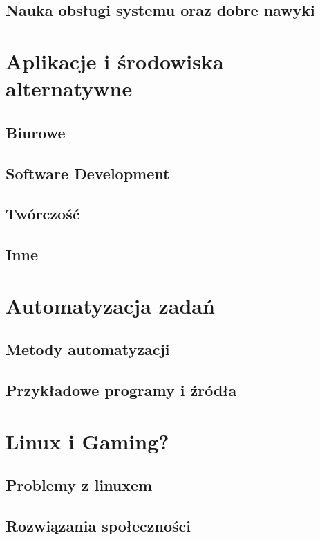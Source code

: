 \documentclass[10pt,a4paper]{report}
\begin{document}
	
	\section{Nauka obsługi systemu oraz dobre nawyki}
	
\chapter{Aplikacje i środowiska alternatywne}

	\section{Biurowe}
	
	\section{Software Development}
	
	\section{Twórczość}
	
	\section{Inne}
	
\chapter{Automatyzacja zadań}

	\section{Metody automatyzacji}
	
	\section{Przykładowe programy i źródła}
	
\chapter{Linux i Gaming?}

	\section{Problemy z linuxem}
	
	\section{Rozwiązania społeczności}
	
\end{document}
